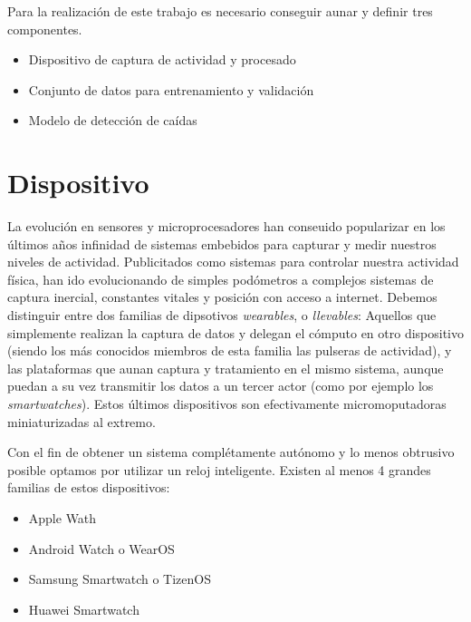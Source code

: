 \documentclass[../tfm.tex]{subfiles}
\begin{document}

Para la realización de este trabajo es necesario conseguir aunar y definir tres componentes.
\begin{itemize}
  \item Dispositivo de captura de actividad y procesado
  \item Conjunto de datos para entrenamiento y validación
  \item Modelo de detección de caídas
\end{itemize}

\section{Dispositivo}

La evolución en sensores y microprocesadores han conseuido popularizar en los últimos años infinidad de sistemas embebidos para capturar y medir nuestros niveles de actividad. Publicitados como sistemas para controlar nuestra actividad física, han ido evolucionando de simples podómetros a complejos sistemas de captura inercial, constantes vitales y posición con acceso a internet. Debemos distinguir entre dos familias de dipsotivos \textit{wearables}, o \textit{llevables}: Aquellos que simplemente realizan la captura de datos y delegan el cómputo en otro dispositivo (siendo los más conocidos miembros de esta familia las pulseras de actividad), y las plataformas que aunan captura y tratamiento en el mismo sistema, aunque puedan a su vez transmitir los datos a un tercer actor (como por ejemplo los \textit{smartwatches}). Estos últimos dispositivos son efectivamente micromoputadoras miniaturizadas al extremo.

Con el fin de obtener un sistema complétamente autónomo y lo menos obtrusivo posible  optamos por utilizar un reloj inteligente. Existen al menos 4 grandes familias de estos dispositivos:

\begin{itemize}
  \item{Apple Wath}
  \item{Android Watch o WearOS}
  \item{Samsung Smartwatch o TizenOS}
  \item{Huawei Smartwatch}
\end{itemize}
\end{document}
